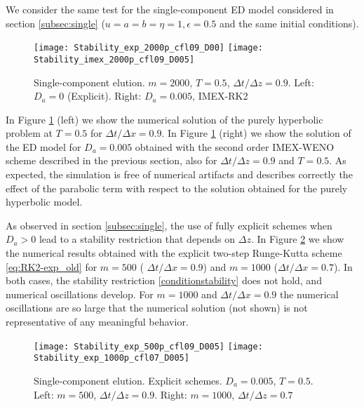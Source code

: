 \documentclass[preprint]{elsarticle}
\theoremstyle{definition}
\begin{document}
We consider the same test for the single-component ED model considered
in section \ref{subsec:single} ($u=a=b=\eta=1, \epsilon=0.5$ and the
same  initial conditions).



\begin{figure}[ht]   
\begin{center} 
\texttt{[image: Stability\_exp\_2000p\_cfl09\_D00]}
\texttt{[image: Stability\_imex\_2000p\_cfl09\_D005]}
\end{center}   
\caption{Single-component elution. $m=2000$,  $T=0.5$,
  $\Delta t/\Delta z=0.9$.  Left:  $D_a=0$ (Explicit). Right: $D_a=0.005$, IMEX-RK2 }   
\label{stability_sin}  
\end{figure}  

 In Figure
\ref{stability_sin} (left)  we show the numerical solution of the purely
hyperbolic problem at $T=0.5$ for $\Delta t/\Delta x =0.9$.
In Figure \ref{stability_sin} (right) we show the solution of the ED
model for $D_a=0.005$ obtained with the second order IMEX-WENO
scheme described in the previous section, also for  $\Delta
t/\Delta z =0.9$ and $T=0.5$. As expected, the 
simulation  is free of numerical artifacts and describes correctly the
effect of the parabolic term with respect to the solution obtained for
the purely hyperbolic model.
 
As observed in section \ref{subsec:single}, the use of fully explicit
schemes when $D_a>0$ lead to     a 
stability restriction that depends on $\Delta z$.
In Figure \ref{stability_con} we show the numerical results obtained 
with the explicit two-step Runge-Kutta scheme \eqref{eq:RK2-exp_old}
for $m=500$ ( $\Delta t/\Delta x =0.9$) and $m=1000$ 
($\Delta t/\Delta x =0.7$). In both cases, the
stability restriction  \eqref{conditionstability} does not hold,
 and numerical oscillations develop. For $m=1000$ and  $\Delta
 t/\Delta x =0.9$ the numerical oscillations are so large that the
 numerical solution (not shown) is not representative of any
 meaningful behavior. 

\begin{figure}[ht]   
\begin{center} 
\texttt{[image: Stability\_exp\_500p\_cfl09\_D005]}
\texttt{[image: Stability\_exp\_1000p\_cfl07\_D005]}
\end{center}   
\caption{Single-component elution. Explicit
  schemes.   $D_a=0.005$, $T=0.5$. Left:  $m=500$, 
  $\Delta t/\Delta z=0.9$. Right:  $m=1000$, 
 $\Delta t/\Delta z=0.7$  }   
\label{stability_con}  
\end{figure} 
\end{document}

